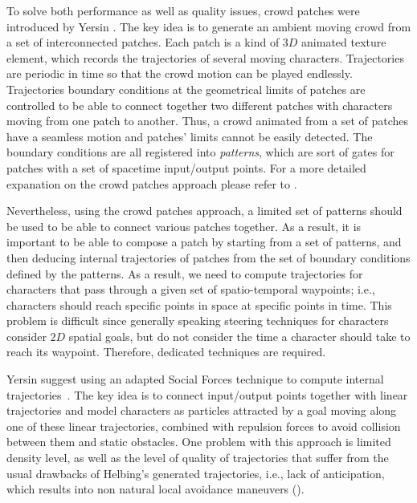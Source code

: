 To solve both performance as well as quality issues, crowd patches were introduced by Yersin \etal \cite{Yersin:2009}.
The key idea is to generate an ambient moving crowd from a set of interconnected patches.
Each patch is a kind of $3D$ animated texture element, which records the trajectories of several moving characters.
Trajectories are periodic in time so that the crowd motion can be played endlessly.
Trajectories boundary conditions at the geometrical limits of patches are controlled to be able to connect together two different patches with characters moving from one patch to another.
Thus, a crowd animated from a set of patches have a seamless motion and patches' limits cannot be easily detected.
The boundary conditions are all registered into {\it patterns}, which are sort of gates for patches with a set of spacetime input/output points.
For a more detailed expanation on the crowd patches approach please refer to \cite{Yersin:2009}. 

Nevertheless, using the crowd patches approach, a limited set of patterns should be used to be able to connect various patches together. As a result, it is important to be able to compose a patch by starting from a set of patterns, and then deducing internal trajectories of patches from the set of boundary conditions defined by the patterns.
As a result, we need to compute trajectories for characters that pass through a given set of spatio-temporal waypoints; i.e., characters should reach specific points in space at specific points in time.
This problem is difficult since generally speaking steering techniques for characters consider $2D$ spatial goals, but do not consider the time a character should take to reach its waypoint.
Therefore, dedicated techniques are required. 

Yersin \etal suggest using an adapted Social Forces technique to compute internal trajectories~\cite{Helbing:2005}.
The key idea is to connect input/output points together with linear trajectories and model characters as particles attracted by a goal moving along one of these linear trajectories, combined with repulsion forces to avoid collision between them and static obstacles.
One problem with this approach is limited density level, as well as the level of quality of trajectories that suffer from the usual drawbacks of Helbing's generated trajectories, i.e., lack of anticipation, which results into non natural local avoidance maneuvers (). 


